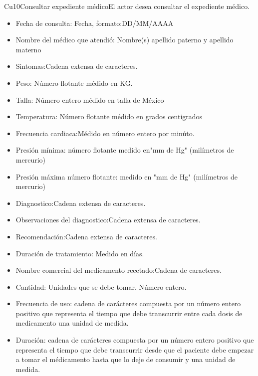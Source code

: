 \begin{UseCase}{Cu10}{Consultar expediente médico}{El actor desea consultar el expediente médico.}
{\begin{itemize}
        \begin{itemize}
            \item Fecha de consulta: Fecha, formato:DD/MM/AAAA
            \item Nombre del médico que atendió: Nombre(s) apellido paterno y apellido materno
            \item Sintomas:Cadena extensa de caracteres.
            \item Peso: Número flotante médido en KG.
            \item Talla: Número entero médido en talla de México
            \item Temperatura: Número flotante médido en grados centigrados
            \item Frecuencia cardiaca:Médido en número entero por minúto.
            \item Presión mínima: número flotante medido en"mm de Hg" (milímetros de mercurio)
            \item Presión máxima número flotante: medido en "mm de Hg" (milímetros de mercurio) 
            \item Diagnostico:Cadena extensa de caracteres.
            \item Observaciones del diagnostico:Cadena extensa de caracteres.
            \item Recomendación:Cadena extensa de caracteres.
            \item Duración de tratamiento: Medido en días.
            \item Nombre comercial del medicamento recetado:Cadena de caracteres.
            \item Cantidad: Unidades que se debe tomar. Número entero.
            \item Frecuencia de uso: cadena de carácteres compuesta por un número entero positivo que representa el tiempo que debe transcurrir entre cada dosis de medicamento una unidad de medida.
            \item Duración: cadena de carácteres compuesta por un número entero positivo que representa el tiempo que debe transcurrir desde que el paciente debe empezar a tomar el médicamento hasta que lo deje de consumir y una unidad de medida.
            

\end{itemize}
\end{itemize}}
\end{UseCase}
